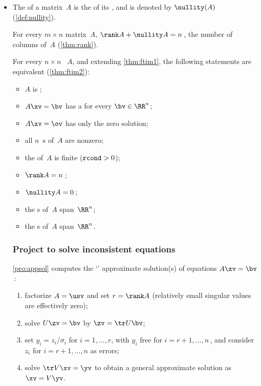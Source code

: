 \begin{itemize}
\item The  of a matrix~\(A\) is the  of its , and is denoted by \(\nullity(A)\) (\cref{def:nullity}).

\itemhi For every \(m\times n\) matrix~\(A\),  \(\rank A+\nullity A=n\)\,, the number of columns of~\(A\) (\cref{thm:rank}).

\itemme For every \(n\times n\) ~\(A\), and extending \cref{thm:ftim1}, the following statements are equivalent (\cref{thm:ftim2}):
\begin{itemize}
\item \(A\) is ;
\item \(A\xv=\bv\) has a  for every \(\bv\in\RR^n\);
\item {}\(A\xv=\ov\) has only the zero solution;
\item all \(n\)~s of~\(A\) are nonzero;
\item the  of~\(A\) is finite (\(\verb|rcond|>0\));
\item \(\rank A=n\)\,;
\item \(\nullity A=0\)\,;
\item the s of~\(A\) span~\(\RR^n\);
\item the s of~\(A\) span~\(\RR^n\).
\end{itemize}





\subsubsection{Project to solve inconsistent equations}

\itemhi \cref{pro:appsol} computes the `' approximate solution(s) of  equations $A\xv=\bv$\,:
\begin{enumerate}
    \item factorize \(A=\usv\) and set \(r=\rank A\) (relatively small singular values are effectively zero);
        \item solve \(U\zv=\bv\) by $\zv=\tr U\bv$;
    
        \item  set $y_i=z_i/\sigma_i$ for $i=1,\ldots,r$, with $y_i$ free for $i=r+1,\ldots,n$\,, and consider \(z_i\) for \(i=r+1,\ldots,n\) as errors; 
    
        \item solve \(\tr V\xv=\yv\) to obtain a general approximate solution as $\xv=V\yv$.
\end{enumerate}


\end{itemize}
